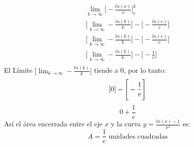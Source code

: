 \begin{align*}
    \lim_{k \rightarrow \infty} \Bigg[-\frac{ln(x)}{x} \Bigg]_{e}^{k} \\
    \Bigg[ \lim_{k \rightarrow \infty} -\frac{ln(k)}{k} \Bigg] - \Bigg[-\frac{ln(e)}{e} \Bigg] \\
    \Bigg[ \lim_{k \rightarrow \infty} -\frac{ln(k)}{k} \Bigg] - \Bigg[-\frac{ln(e)}{e} \Bigg] \\
    \Bigg[ \lim_{k \rightarrow \infty} -\frac{ln(k)}{k} \Bigg] - \Bigg[-\frac{1}{e} \Bigg] \\
\end{align*}
El Límite $\Bigg[ \lim_{k \rightarrow \infty} -\frac{ln(k)}{k} \Bigg]$ tiende a 0, por lo tanto:
\[
[0] - \Bigg[-\frac{1}{e} \Bigg] \\
\]
\[
0 + \frac{1}{e}
\]
Así el área encerrada entre el eje $x$ y la curva $y = \frac{ln(x)-1}{x^{2}}$ es: \\
\[
A = \frac{1}{e} \text{ unidades cuadradas}
\]